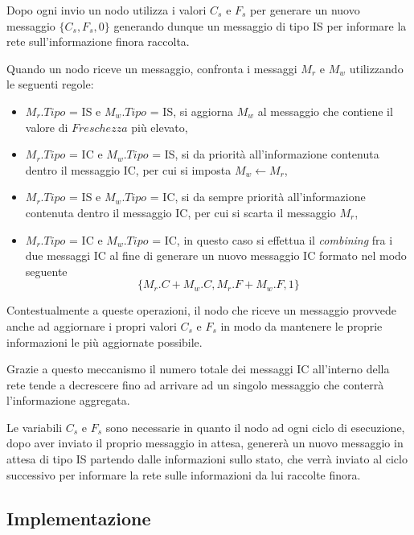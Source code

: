 \documentclass[a4paper,12pt]{article}
\begin{document}
Dopo ogni invio un nodo utilizza i valori $C_s$ e $F_s$ per generare un nuovo messaggio $\{ C_s, F_s, 0 \}$ generando dunque un messaggio di tipo IS per informare la rete sull'informazione finora raccolta.

Quando un nodo riceve un messaggio, confronta i messaggi $M_r$ e $M_w$ utilizzando le seguenti regole:
\begin{itemize}
\item $M_r.Tipo$ = IS e $M_w.Tipo$ = IS, si aggiorna $M_w$ al messaggio che contiene il valore di $Freschezza$ pi\`u elevato,
\item $M_r.Tipo$ = IC e $M_w.Tipo$ = IS, si da priorit\`a all'informazione contenuta dentro il messaggio IC, per cui si imposta $M_w \leftarrow M_r$,
\item $M_r.Tipo$ = IS e $M_w.Tipo$ = IC, si da sempre priorit\`a all'informazione contenuta dentro il messaggio IC, per cui si scarta il messaggio $M_r$,
\item $M_r.Tipo$ = IC e $M_w.Tipo$ = IC, in questo caso si effettua il \emph{combining} fra i due messaggi IC al fine di generare un nuovo messaggio IC formato nel modo seguente $$\{ M_r.C + M_w.C, M_r.F + M_w.F, 1 \}$$
\end{itemize}
Contestualmente a queste operazioni, il nodo che riceve un messaggio provvede anche ad aggiornare i propri valori $C_s$ e $F_s$ in modo da mantenere le proprie informazioni le pi\`u aggiornate possibile.

Grazie a questo meccanismo il numero totale dei messaggi IC all'interno della rete tende a decrescere fino ad arrivare ad un singolo messaggio che conterr\`a l'informazione aggregata.

Le variabili $C_s$ e $F_s$ sono necessarie in quanto il nodo ad ogni ciclo di esecuzione, dopo aver inviato il proprio messaggio in attesa, generer\`a un nuovo messaggio in attesa di tipo IS partendo dalle informazioni sullo stato, che verr\`a inviato al ciclo successivo per informare la rete sulle informazioni da lui raccolte finora.

\subsection{Implementazione}
\end{document}
